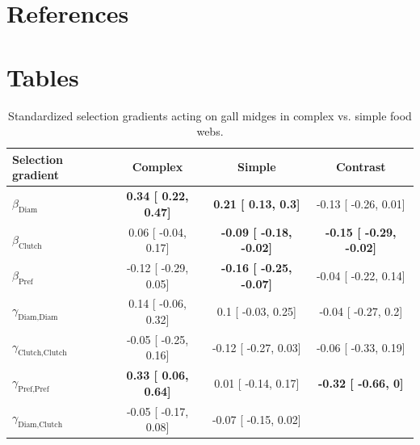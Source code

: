 \documentclass[11pt,]{article}
\begin{document}
\section{References}\label{references}

\hypertarget{refs}{}

\newpage 

\section{Tables}\label{tables}

\begin{table}[h]
\caption{Standardized selection gradients acting on gall midges in complex vs. simple food webs.}
\label{Table:Gradients}
\centering
\begin{tabular}{lccc}
\\ 
\hline
\textbf{Selection gradient} & \textbf{Complex} & \textbf{Simple} & \textbf{Contrast}  \\ 
\hline
$\beta_{\text{Diam}}$ & 
\textbf{
0.34 [
0.22,
0.47] }& 
\textbf{
0.21 [
0.13,
0.3] }& 

-0.13 [
-0.26,
0.01] \\

$\beta_{\text{Clutch}}$ & 
0.06 [
-0.04,
0.17] & 
\textbf{
-0.09 [
-0.18,
-0.02] }& 
\textbf{
-0.15 [
-0.29,
-0.02] }\\

$\beta_{\text{Pref}}$ &
-0.12 [
-0.29,
0.05] & 
\textbf{
-0.16 [
-0.25,
-0.07] }& 

-0.04 [
-0.22,
0.14] \\

$\gamma_{\text{Diam,Diam}}$ &
0.14 [
-0.06,
0.32] & 

0.1 [
-0.03,
0.25] & 

-0.04 [
-0.27,
0.2] \\

$\gamma_{\text{Clutch,Clutch}}$ & 
-0.05 [
-0.25,
0.16] & 

-0.12 [
-0.27,
0.03] & 

-0.06 [
-0.33,
0.19] \\

$\gamma_{\text{Pref,Pref}}$ & 
\textbf{
0.33 [
0.06,
0.64] }& 

0.01 [
-0.14,
0.17] & 
\textbf{
-0.32 [
-0.66,
0] }\\

$\gamma_{\text{Diam,Clutch}}$ & 
-0.05 [
-0.17,
0.08] & 

-0.07 [
-0.15,
0.02] & 


\end{tabular}
\end{table}
\end{document}
